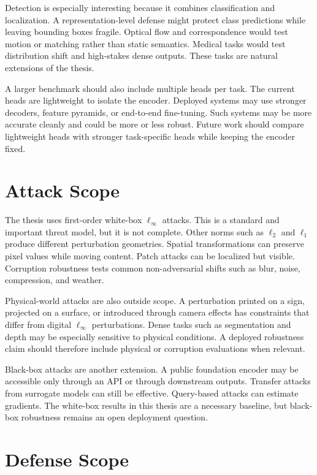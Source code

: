 Detection is especially interesting because it combines classification and localization. A representation-level defense might protect class predictions while leaving bounding boxes fragile. Optical flow and correspondence would test motion or matching rather than static semantics. Medical tasks would test distribution shift and high-stakes dense outputs. These tasks are natural extensions of the thesis.

A larger benchmark should also include multiple heads per task. The current heads are lightweight to isolate the encoder. Deployed systems may use stronger decoders, feature pyramids, or end-to-end fine-tuning. Such systems may be more accurate cleanly and could be more or less robust. Future work should compare lightweight heads with stronger task-specific heads while keeping the encoder fixed.

\section{Attack Scope}

The thesis uses first-order white-box $\ell_\infty$ attacks. This is a standard and important threat model, but it is not complete. Other norms such as $\ell_2$ and $\ell_1$ produce different perturbation geometries. Spatial transformations can preserve pixel values while moving content. Patch attacks can be localized but visible. Corruption robustness tests common non-adversarial shifts such as blur, noise, compression, and weather.

Physical-world attacks are also outside scope. A perturbation printed on a sign, projected on a surface, or introduced through camera effects has constraints that differ from digital $\ell_\infty$ perturbations. Dense tasks such as segmentation and depth may be especially sensitive to physical conditions. A deployed robustness claim should therefore include physical or corruption evaluations when relevant.

Black-box attacks are another extension. A public foundation encoder may be accessible only through an API or through downstream outputs. Transfer attacks from surrogate models can still be effective. Query-based attacks can estimate gradients. The white-box results in this thesis are a necessary baseline, but black-box robustness remains an open deployment question.

\section{Defense Scope}

